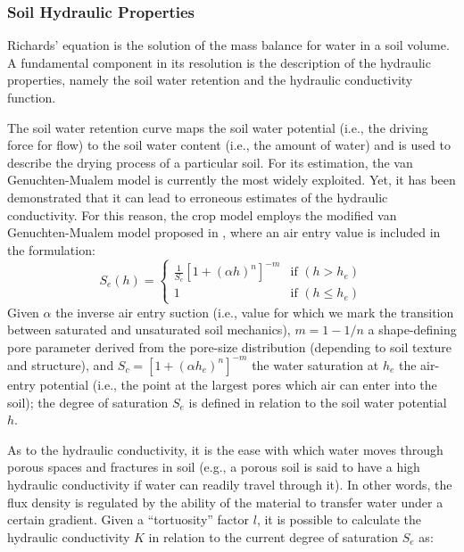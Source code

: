 \subsubsection{Soil Hydraulic Properties}
\label{orchard-sec:soil_properties}
Richards' equation is the solution of the mass balance for water in a soil volume.
A fundamental component in its resolution is the description of the hydraulic properties, namely the soil water retention and the hydraulic conductivity function.

The soil water retention curve maps the soil water potential  (i.e., the driving force for flow) to the soil water content (i.e., the amount of water) and is used to describe the drying process of a particular soil.
For its estimation, the van Genuchten-Mualem model is currently the most widely exploited.
Yet, it has been demonstrated that it can lead to erroneous estimates of the hydraulic conductivity.
For this reason, the crop model employs the modified van Genuchten-Mualem model proposed in \cite{ippisch-etal-2006}, where an air entry value is included in the formulation:
\begin{equation}
\label{ippisch}
S_e(h)=          \left\{ \begin{array}{ll}
\frac{1}{S_c} \left[1+(\alpha h)^n \right]^{-m} &\mbox{if $(h > h_e)$}\\
1                             &\mbox{if $(h \leq h_e)$}
           \end{array}
        \right.
\end{equation}
Given $\alpha$ the inverse air entry suction (i.e., value for which we mark the transition between saturated and unsaturated soil mechanics), $m = 1 - 1/n$ a shape-defining pore parameter derived from the pore-size distribution (depending to soil texture and structure), and $S_c = [1+ (\alpha h_e)^n]^{-m}$ the water saturation at $h_e$ the air-entry potential (i.e., the point at the largest pores which air can enter into the soil); the degree of saturation $S_e$ is defined in relation to the soil water potential $h$.

As to the hydraulic conductivity, it is the ease with which water moves through porous spaces and fractures in soil (e.g., a porous soil is said to have a high hydraulic conductivity if water can readily travel through it).
In other words, the flux density is regulated by the ability of the material to transfer water under a certain gradient.
Given a ``tortuosity'' factor $l$, it is possible to calculate the hydraulic conductivity $K$ in relation to the current degree of saturation $S_e$ as:

